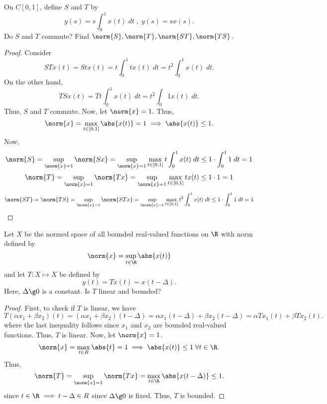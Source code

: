 \begin{question}
    On $C[0,1]$, define $S$ and $T$ by
    \[y(s) = s\int_{0}^{1}x(t) \; dt \;,\; y(s) = sx(s).\]
    Do $S$ and $T$ commute? Find $\norm{S} , \norm{T} , \norm{ST}, \norm{TS}$.
    \label{section2.7-10}
\end{question}
\begin{proof}
    Consider 
    \[STx(t) = Stx(t) = t\int_{0}^1 tx(t) \; dt = t^2 \int_{0}^{1}x(t) \; dt.\]
    On the other hand, 
    \[TSx(t) = Tt\int_{0}^{1} x(t) \;dt = t^2 \int_{0} {1} x(t) \;dt.\]
    Thus, $S$ and $T$ commute. Now, let $\norm{x} = 1.$ Thus, 
    \[\norm{x} = \max_{t \in [0,1]} \abs{x(t)} = 1 \implies \abs{x(t)} \leq 1.\]
    Now, 
    \[\norm{S} = \sup_{\norm{x} = 1} \norm{Sx} = \sup_{\norm{x} = 1} \max_{t \in [0,1]} t\int_{0}^1 x(t) \;dt \leq 1 \cdot \int_{0}^{1} 1\;dt = 1\]
    \[\norm{T} = \sup_{\norm{x} = 1} \norm{Tx} = \sup_{\norm{x} = 1} \max_{t \in [0,1]} tx(t) \leq 1 \cdot 1 = 1\]
    \[\norm{ST} = \norm{TS} = \sup_{\norm{x} = 1} \norm{STx} = \sup_{\norm{x} = 1} \max_{t \in [0,1]} t^2\int_{0}^1 x(t) \;dt \leq 1 \cdot \int_{0}^{1} 1\;dt = 1\]
   
\end{proof}

\begin{question}
    Let $X$ be the normed space of all bounded real-valued functions on $\R$ with norm defined by
    \[\norm{x} = \sup_{t \in \R} \abs{x(t)}\]
    and let $T : X \mapsto X$ be defined by
    \[y(t) = Tx(t) = x(t - \Delta).\]
    Here, $\Delta \g 0$ is a constant. Is $T$ linear and bounded?
    \label{section2.7-11}
\end{question}
\begin{proof}
    First, to check if $T$ is linear, we have
    \[T(\alpha x_1 + \beta x_2)(t) = (\alpha x_1 + \beta x_2)(t - \Delta) = \alpha x_1(t-\Delta) + \beta x_2(t-\Delta) = \alpha Tx_1(t) + \beta Tx_2(t). \]
    where the last inequality follows since $x_1$ and $x_2$ are bounded real-valued functions. Thus, $T$ is linear.
    Now, let $\norm{x} = 1$.
    \[\norm{x} = \max_{t \in R}\abs{t} = 1 \implies \abs{x(t)} \leq 1 \; \forall t \in \R.\]
    Thus, 
    \[\norm{T} = \sup_{\norm{x} = 1} \norm{Tx} = \max_{t \in \R} \abs{x(t - \Delta)} \leq 1.\]
    since $t \in \R \implies t - \Delta \in R$ since $\Delta \g 0$ is fixed. Thus, $T$ is bounded.
\end{proof}


